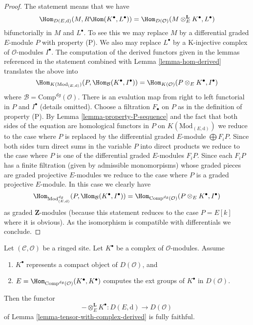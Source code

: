 \begin{proof}
The statement means that we have
$$
\Hom_{D(E, \text{d})}(M, R\Hom(K^\bullet, L^\bullet)) =
\Hom_{D(\mathcal{O})}(M \otimes^\mathbf{L}_E K^\bullet, L^\bullet)
$$
bifunctorially in $M$ and $L^\bullet$. To see this we may replace $M$
by a differential graded $E$-module $P$ with property (P).
We also may replace $L^\bullet$ by a K-injective complex of
$\mathcal{O}$-modules $I^\bullet$. The computation
of the derived functors given in the lemmas referenced in the statement
combined with Lemma \ref{lemma-hom-derived} translates the above into
$$
\Hom_{K(\text{Mod}_{(E, \text{d})})}
(P, \Hom_\mathcal{B}(K^\bullet, I^\bullet)) =
\Hom_{K(\mathcal{O})}(P \otimes_E K^\bullet, I^\bullet)
$$
where $\mathcal{B} = \text{Comp}^{dg}(\mathcal{O})$. 
There is an evalution map from right to left functorial
in $P$ and $I^\bullet$ (details omitted).
Choose a filtration $F_\bullet$ on $P$ as in the definition of property (P).
By Lemma \ref{lemma-property-P-sequence} and the fact that
both sides of the equation are homological functors in $P$
on $K(\text{Mod}_{(E, \text{d})})$
we reduce to the case where $P$ is replaced by
the differential graded $E$-module $\bigoplus F_iP$.
Since both sides turn direct sums in the variable $P$
into direct products we reduce to the case where $P$ is one of the
differential graded $E$-modules $F_iP$.
Since each $F_iP$ has a finite filtration (given by admissible
monomorpisms) whose graded pieces are graded projective $E$-modules
we reduce to the case where $P$ is a graded projective $E$-module.
In this case we clearly have
$$
\Hom_{\text{Mod}^{dg}_{(E, \text{d})}}
(P, \Hom_\mathcal{B}(K^\bullet, I^\bullet)) =
\Hom_{\text{Comp}^{dg}(\mathcal{O})}(P \otimes_E K^\bullet, I^\bullet)
$$
as graded $\mathbf{Z}$-modules (because this statement reduces to the case
$P = E[k]$ where it is obvious). As the isomorphism is compatible with
differentials we conclude.
\end{proof}

\begin{lemma}
\label{lemma-fully-faithful-in-compact-case}
Let $(\mathcal{C}, \mathcal{O})$ be a ringed site.
Let $K^\bullet$ be a complex of $\mathcal{O}$-modules.
Assume
\begin{enumerate}
\item $K^\bullet$ represents a compact object of $D(\mathcal{O})$, and
\item $E = \Hom_{\text{Comp}^{dg}(\mathcal{O})}(K^\bullet, K^\bullet)$
computes the ext groups of $K^\bullet$ in $D(\mathcal{O})$.
\end{enumerate}
Then the functor
$$
- \otimes_E^\mathbf{L} K^\bullet :
D(E, \text{d})
\longrightarrow
D(\mathcal{O})
$$
of Lemma \ref{lemma-tensor-with-complex-derived} is fully faithful.
\end{lemma}

